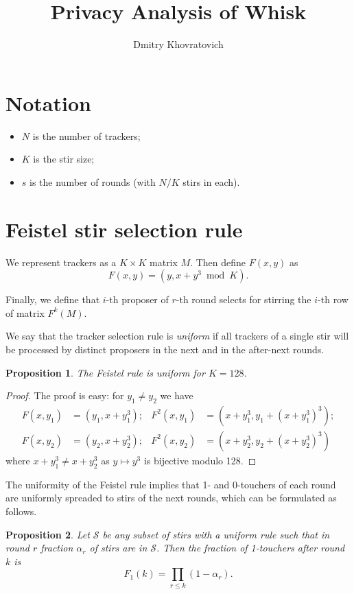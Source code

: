 \documentclass{article}
\title{Privacy Analysis of Whisk}
\author{ Dmitry Khovratovich}
\newtheorem{proposition}{Proposition}
\begin{document}
\maketitle

\section{Notation}
\begin{itemize}
    \item $N$ is the number of trackers;
    \item $K$ is the stir size;
    \item $s$ is the number of rounds (with $N/K$ stirs in each).
\end{itemize}

\section{Feistel stir selection rule}

We represent trackers as a $K\times K$ matrix $M$. Then define $F(x,y)$ as
$$
F(x,y) = (y, x+y^3 \bmod{K}).
$$

Finally, we  define  that $i$-th proposer of $r$-th round selects for stirring the $i$-th row of matrix $F^k(M)$.

We say that the tracker selection rule is \emph{uniform} if all trackers of a single stir will be processed by distinct proposers in the next and in the after-next rounds.


\begin{proposition}
The Feistel rule is uniform for $K=128$.
\end{proposition}
\begin{proof}
The proof is easy: for $y_1\neq y_2$ we have
\begin{align*}
F(x,y_1) &= (y_1,x+y_1^3);& F^2(x,y_1) &= (x+y_1^3,y_1+(x+y_1^3)^3);\\ F(x,y_2) &= (y_2,x+y_2^3);& F^2(x,y_2) &= (x+y_2^3,y_2+(x+y_2^3)^3)
\end{align*}
where  $x+y_1^3\neq x+y_2^3$ as $y\mapsto y^3$ is bijective modulo 128.
\end{proof}

The uniformity of the Feistel rule implies that 1- and 0-touchers of each round are uniformly spreaded to stirs of the next rounds, which can be formulated as follows.

\begin{proposition}\label{prop:f2}
Let $\mathcal{S}$ be any subset of  stirs with a uniform rule such that in round $r$ fraction $\alpha_r$ of stirs are in $\mathcal{S}$. Then the fraction of 1-touchers after round $k$ is $$
F_1(k)=\prod_{r\leq k} (1-\alpha_r).
$$
\end{proposition}
\end{document}
